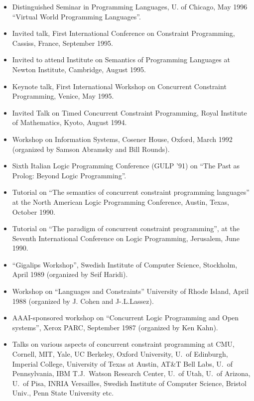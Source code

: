 \documentclass{article}
\begin{document}
\begin{itemize}
 \item Distinguished Seminar in Programming Languages, U. of
    Chicago,  May 1996 ``Virtual World Programming Languages''. 

 \item Invited talk, First International Conference
    on Constraint Programming, Cassiss, France, September 1995. 

 \item Invited to attend Institute on Semantics of Programming
    Languages at Newton Institute, Cambridge, August 1995.  

 \item Keynote talk, First International Workshop on
    Concurrent Constraint Programming, Venice, May 1995. 

 \item Invited Talk on Timed Concurrent Constraint
    Programming, Royal Institute of Mathematics, Kyoto, August
    1994. 

 \item Workshop on Information Systems, Cosener House, Oxford,
    March 1992 (organized by Samson Abramsky and Bill Rounds).

 \item Sixth Italian Logic Programming Conference (GULP '91)
    on ``The Past as Prolog: Beyond Logic Programming''.

 \item Tutorial on ``The semantics of concurrent constraint
    programming languages'' at the North American Logic Programming
    Conference, Austin, Texas, October 1990.

 \item Tutorial on ``The paradigm of concurrent constraint
    programming'', at the Seventh  International Conference on Logic
    Programming, Jerusalem, June 1990. 

 \item ``Gigalips Workshop'', Swedish Institute of Computer
    Science, Stockholm, April 1989 (organized by Seif Haridi).

 \item Workshop on ``Languages and Constraints''  University of
    Rhode Island, April 1988 (organized by J. Cohen and J-.L.Lassez).

 \item AAAI-sponsored workshop on ``Concurrent Logic Programming
    and Open systems'', Xerox PARC, September 1987 (organized by Ken
    Kahn).

 \item Talks on various aspects of concurrent constraint programming
    at CMU, Cornell, MIT, Yale, UC Berkeley, Oxford University, U.~of
    Edinburgh, Imperial College, University of Texas at Austin, AT\&T
    Bell Labs, U.~of Pennsylvania, IBM T.J.~Watson Research Center,
    U.~of Utah, U.~of Arizona, U.~of Pisa, INRIA Versailles, Swedish
    Institute of Computer Science, Bristol Univ., Penn State
    University etc.
\end{itemize}
\end{document}
